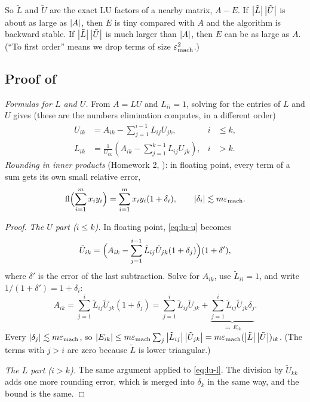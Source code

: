 So $\tilde{L}$ and $\tilde{U}$ are the exact LU factors of a nearby matrix, $A - E$. If $\left\lvert \tilde{L} \right\rvert\left\lvert \tilde{U} \right\rvert$ is about as large as $\left\lvert A \right\rvert$, then $E$ is tiny compared with $A$ and the algorithm is backward stable. If $\left\lvert \tilde{L} \right\rvert\left\lvert \tilde{U} \right\rvert$ is much larger than $\left\lvert A \right\rvert$, then $E$ can be as large as $A$. (``To first order'' means we drop terms of size $\varepsilon_{\mathrm{mach}}^2$.)

\subsection{Proof of }

\emph{Formulas for $L$ and $U$.} From $A = LU$ and $L_{ii} = 1$, solving for the entries of $L$ and $U$ gives (these are the numbers elimination computes, in a different order)
\begin{align}
  U_{ik} &= A_{ik} - \sum_{j=1}^{i-1} L_{ij}U_{jk}, & i &\le k, \label{eq:lu-u} \\
  L_{ik} &= \frac{1}{U_{kk}}\left(A_{ik} - \sum_{j=1}^{k-1} L_{ij}U_{jk}\right), & i &> k. \label{eq:lu-l}
\end{align}
\emph{Rounding in inner products} (Homework 2, ): in floating point, every term of a sum gets its own small relative error,
\begin{equation}
  \operatorname{fl}\Bigl(\sum_{i=1}^{m} x_iy_i\Bigr) = \sum_{i=1}^{m} x_iy_i(1 + \delta_i), \qquad \left\lvert \delta_i \right\rvert \lesssim m\varepsilon_{\mathrm{mach}}.
\end{equation}

\begin{proof}
  \emph{The $U$ part ($i \le k$).} In floating point, \eqref{eq:lu-u} becomes
  \begin{equation}
    \tilde{U}_{ik} = \Bigl(A_{ik} - \sum_{j=1}^{i-1}\tilde{L}_{ij}\tilde{U}_{jk}(1 + \delta_j)\Bigr)(1 + \delta'),
  \end{equation}
  where $\delta'$ is the error of the last subtraction. Solve for $A_{ik}$, use $\tilde{L}_{ii} = 1$, and write $1/(1 + \delta') = 1 + \delta_i$:
  \begin{equation}
    A_{ik} = \sum_{j=1}^{i}\tilde{L}_{ij}\tilde{U}_{jk}(1 + \delta_j) = \sum_{j=1}^{i}\tilde{L}_{ij}\tilde{U}_{jk} + \underbrace{\sum_{j=1}^{i}\tilde{L}_{ij}\tilde{U}_{jk}\delta_j}_{\eqqcolon\, E_{ik}}.
  \end{equation}
  Every $\left\lvert \delta_j \right\rvert \lesssim m\varepsilon_{\mathrm{mach}}$, so $\left\lvert E_{ik} \right\rvert \le m\varepsilon_{\mathrm{mach}}\sum_j\left\lvert \tilde{L}_{ij} \right\rvert\left\lvert \tilde{U}_{jk} \right\rvert = m\varepsilon_{\mathrm{mach}}(\left\lvert \tilde{L} \right\rvert\left\lvert \tilde{U} \right\rvert)_{ik}$. (The terms with $j > i$ are zero because $\tilde{L}$ is lower triangular.)

  \emph{The $L$ part ($i > k$).} The same argument applied to \eqref{eq:lu-l}. The division by $\tilde{U}_{kk}$ adds one more rounding error, which is merged into $\delta_k$ in the same way, and the bound is the same.
\end{proof}

